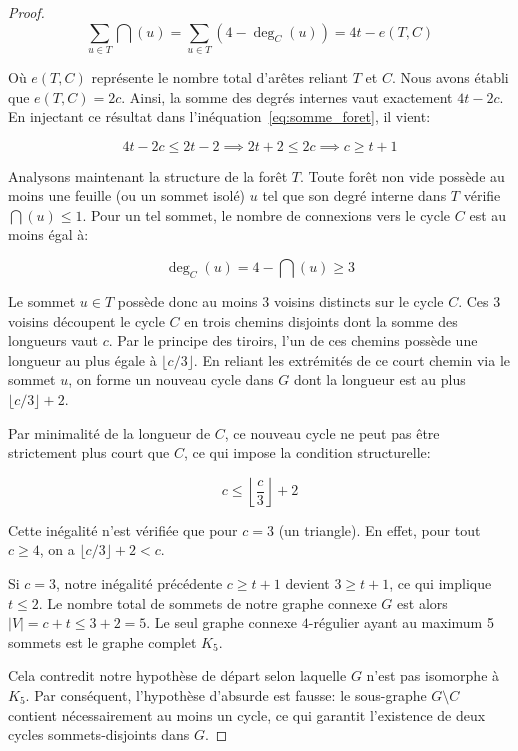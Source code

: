 \begin{proof}
    \begin{equation*}
        \sum_{u \in T} \dint(u) = \sum_{u \in T} (4 - \deg_C(u)) = 4t - e(T, C)
    \end{equation*}

    Où \(e(T,C)\) représente le nombre total d'arêtes reliant \(T\) et \(C\). 
    Nous avons établi que \(e(T,C) = 2c\). Ainsi, la somme des degrés internes vaut exactement \(4t - 2c\). 
    En injectant ce résultat dans l'inéquation~\eqref{eq:somme_foret}, il vient:

    \begin{equation*}
        4t - 2c \leq 2t - 2 \implies 2t + 2 \leq 2c \implies c \geq t + 1
    \end{equation*}

    Analysons maintenant la structure de la forêt \(T\). 
    Toute forêt non vide possède au moins une feuille (ou un sommet isolé) \(u\) tel que son degré interne dans \(T\) vérifie \(\dint(u) \leq 1\).
    Pour un tel sommet, le nombre de connexions vers le cycle \(C\) est au moins égal à:

    \begin{equation*}
        \deg_C(u) = 4 - \dint(u) \geq 3
    \end{equation*}

    Le sommet \(u \in T\) possède donc au moins 3 voisins distincts sur le cycle \(C\). 
    Ces 3 voisins découpent le cycle \(C\) en trois chemins disjoints dont la somme des longueurs vaut \(c\). 
    Par le principe des tiroirs, l'un de ces chemins possède une longueur au plus égale à \(\lfloor c/3 \rfloor\). 
    En reliant les extrémités de ce court chemin via le sommet \(u\), on forme un nouveau cycle dans \(G\) dont la longueur est au plus \(\lfloor c/3 \rfloor + 2\).

    Par minimalité de la longueur de \(C\), ce nouveau cycle ne peut pas être strictement plus court que \(C\), ce qui impose la condition structurelle:

    \begin{equation*}
        c \leq \left\lfloor \frac{c}{3} \right\rfloor + 2
    \end{equation*}

    Cette inégalité n'est vérifiée que pour \(c = 3\) (un triangle). 
    En effet, pour tout \(c \geq 4\), on a \(\lfloor c/3 \rfloor + 2 < c\).

    Si \(c = 3\), notre inégalité précédente \(c \geq t + 1\) devient \(3 \geq t + 1\), ce qui implique \(t \leq 2\). 
    Le nombre total de sommets de notre graphe connexe \(G\) est alors \(|V| = c + t \leq 3 + 2 = 5\). 
    Le seul graphe connexe \(4\)-régulier ayant au maximum 5 sommets est le graphe complet \(K_5\).

    Cela contredit notre hypothèse de départ selon laquelle \(G\) n'est pas isomorphe à \(K_5\). 
    Par conséquent, l'hypothèse d'absurde est fausse: le sous-graphe \(G \setminus C\) contient nécessairement au moins un cycle, ce qui garantit l'existence de deux cycles sommets-disjoints dans \(G\).
\end{proof}

